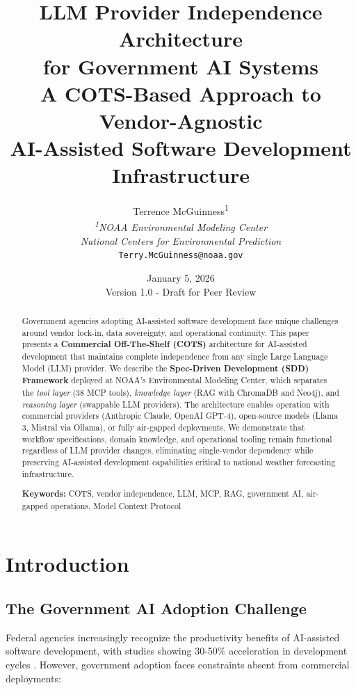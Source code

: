 \documentclass[11pt,twocolumn]{article}
\title{
    \textbf{LLM Provider Independence Architecture} \\
    \textbf{for Government AI Systems} \\
    \vspace{0.3cm}
    \large A COTS-Based Approach to Vendor-Agnostic \\
    AI-Assisted Software Development Infrastructure
}
\author{
    Terrence McGuinness\textsuperscript{1} \\
    \textit{\small \textsuperscript{1}NOAA Environmental Modeling Center} \\
    \textit{\small National Centers for Environmental Prediction} \\
    \texttt{\small Terry.McGuinness@noaa.gov}
}
\date{January 5, 2026 \\ Version 1.0 - Draft for Peer Review}
\begin{document}
\maketitle

\begin{abstract}
Government agencies adopting AI-assisted software development face unique challenges around vendor lock-in, data sovereignty, and operational continuity. This paper presents a \textbf{Commercial Off-The-Shelf (COTS)} architecture for AI-assisted development that maintains complete independence from any single Large Language Model (LLM) provider. We describe the \textbf{Spec-Driven Development (SDD) Framework} deployed at NOAA's Environmental Modeling Center, which separates the \textit{tool layer} (38 MCP tools), \textit{knowledge layer} (RAG with ChromaDB and Neo4j), and \textit{reasoning layer} (swappable LLM providers). The architecture enables operation with commercial providers (Anthropic Claude, OpenAI GPT-4), open-source models (Llama 3, Mistral via Ollama), or fully air-gapped deployments. We demonstrate that workflow specifications, domain knowledge, and operational tooling remain functional regardless of LLM provider changes, eliminating single-vendor dependency while preserving AI-assisted development capabilities critical to national weather forecasting infrastructure.

\vspace{0.3cm}
\noindent\textbf{Keywords:} COTS, vendor independence, LLM, MCP, RAG, government AI, air-gapped operations, Model Context Protocol
\end{abstract}

\section{Introduction}

\subsection{The Government AI Adoption Challenge}

Federal agencies increasingly recognize the productivity benefits of AI-assisted software development, with studies showing 30-50\% acceleration in development cycles \cite{github2023}. However, government adoption faces constraints absent from commercial deployments:
\end{document}
